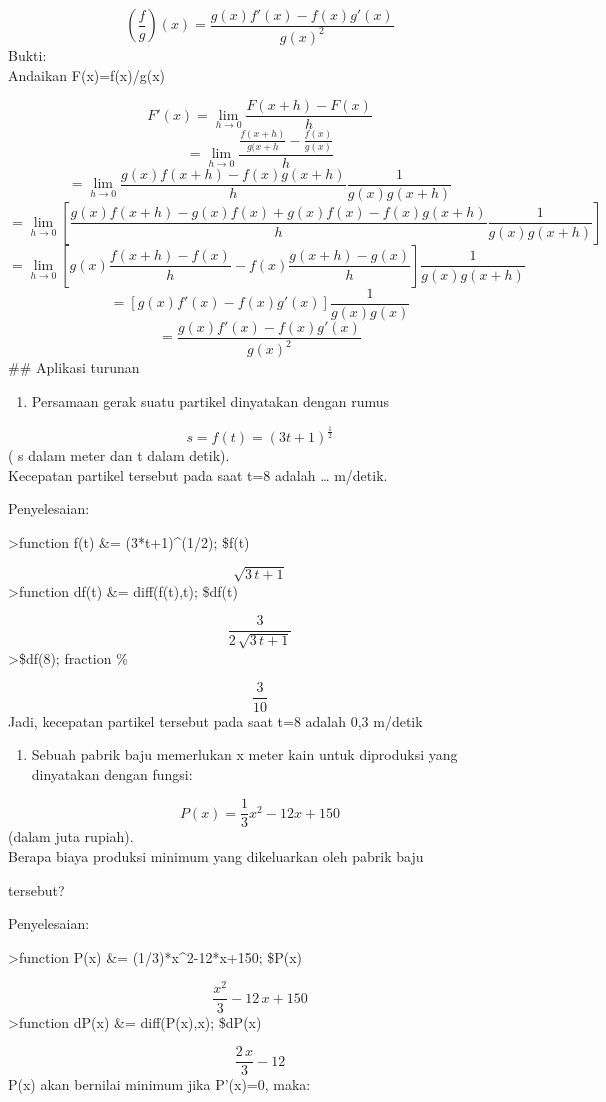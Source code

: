 \documentclass[
]{book}
\providecommand{\tightlist}{%
  \setlength{\itemsep}{0pt}\setlength{\parskip}{0pt}}
\begin{document}
\[(\frac{f}{g})(x)=\frac{g(x)f'(x)-f(x)g'(x)}{g(x)^2}\] Bukti:\\
Andaikan F(x)=f(x)/g(x)

\[F'(x)= \lim_{h\to 0}\frac{F(x+h)-F(x)}{h}\]\[= \lim_{h\to 0}\frac{\frac{f(x+h)}{g(x+h}-\frac{f(x)}{g(x)}}{h}\]\[= \lim_{h\to 0}\frac{g(x)f(x+h)-f(x)g(x+h)}{h}\frac{1}{g(x)g(x+h)}\]\[= \lim_{h\to 0}[\frac{g(x)f(x+h)-g(x)f(x)+g(x)f(x)-f(x)g(x+h)}{h}\frac{1}{g(x)g(x+h)}]\]\[=\lim_{h\to 0} [g(x)\frac{f(x+h)-f(x)}{h}-f(x)\frac{g(x+h)-g(x)}{h}]\frac{1}{g(x)g(x+h)}\]\[=[g(x)f'(x)-f(x)g'(x)]\frac{1}{g(x)g(x)}\]\[=\frac{g(x)f'(x)-f(x)g'(x)}{g(x)^2}\]\#\# Aplikasi turunan

\begin{enumerate}
\def\labelenumi{\arabic{enumi}.}
\tightlist
\item
  Persamaan gerak suatu partikel dinyatakan dengan rumus
\end{enumerate}

\[s=f(t)=(3t+1)^{\frac{1}{2}}\] ( s dalam meter dan t dalam detik).\\
Kecepatan partikel tersebut pada saat t=8 adalah \ldots{} m/detik.

Penyelesaian:

\textgreater function f(t) \&= (3*t+1)\^{}(1/2); \$f(t)

\[\sqrt{3\,t+1}\]\textgreater function df(t) \&= diff(f(t),t); \$df(t)

\[\frac{3}{2\,\sqrt{3\,t+1}}\]\textgreater\$df(8); fraction \%

\[\frac{3}{10}\] Jadi, kecepatan partikel tersebut pada saat t=8 adalah 0,3 m/detik

\begin{enumerate}
\def\labelenumi{\arabic{enumi}.}
\setcounter{enumi}{1}
\tightlist
\item
  Sebuah pabrik baju memerlukan x meter kain untuk diproduksi yang dinyatakan dengan fungsi:
\end{enumerate}

\[P(x)={\frac{1}{3}}x^2-12x+150\] (dalam juta rupiah).\\
Berapa biaya produksi minimum yang dikeluarkan oleh pabrik baju

tersebut?

Penyelesaian:

\textgreater function P(x) \&= (1/3)*x\^{}2-12*x+150; \$P(x)

\[\frac{x^2}{3}-12\,x+150\]\textgreater function dP(x) \&= diff(P(x),x); \$dP(x)

\[\frac{2\,x}{3}-12\] P(x) akan bernilai minimum jika P'(x)=0, maka:
\end{document}
